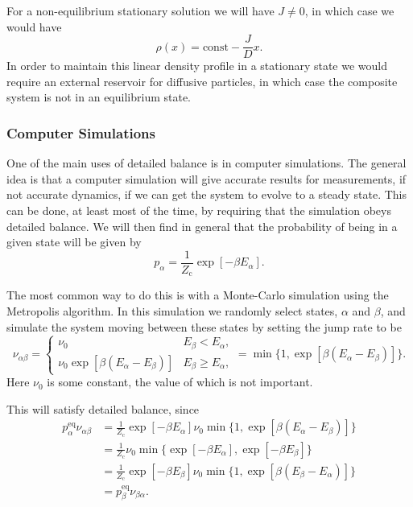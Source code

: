 \documentclass[fleqn]{NotesClass}
\newcommand*{\cpartition}{Z_{\mathrm{c}}}
\begin{document}
    For a non-equilibrium stationary solution we will have \(J \ne 0\), in which case we would have
    \begin{equation}
        \rho(x) = \mathrm{const} - \frac{J}{D}x.
    \end{equation}
    In order to maintain this linear density profile in a stationary state we would require an external reservoir for diffusive particles, in which case the composite system is not in an equilibrium state.
    
    \subsubsection{Computer Simulations}
    One of the main uses of detailed balance is in computer simulations.
    The general idea is that a computer simulation will give accurate results for measurements, if not accurate dynamics, if we can get the system to evolve to a steady state.
    This can be done, at least most of the time, by requiring that the simulation obeys detailed balance.
    We will then find in general that the probability of being in a given state will be given by
    \begin{equation}
        p_\alpha = \frac{1}{\cpartition} \exp[-\beta E_\alpha].
    \end{equation}
    
    The most common way to do this is with a Monte-Carlo simulation using the Metropolis algorithm.
    In this simulation we randomly select states, \(\alpha\) and \(\beta\), and simulate the system moving between these states by setting the jump rate to be
    \begin{equation}
        \nu_{\alpha\beta} = 
        \begin{cases}
            \nu_0 & E_\beta < E_\alpha,\\
            \nu_0\exp[\beta(E_\alpha - E_\beta)] & E_\beta \ge E_\alpha,
        \end{cases}
        = \min \{ 1, \exp[\beta(E_\alpha - E_\beta)] \}.
    \end{equation}
    Here \(\nu_0\) is some constant, the value of which is not important.
    
    This will satisfy detailed balance, since
    \begin{align}
        p_\alpha^{\mathrm{eq}}\nu_{\alpha\beta} &= \frac{1}{\cpartition} \exp[-\beta E_\alpha]\nu_0\min\{1, \exp[\beta(E_\alpha - E_\beta)]\}\\
        &= \frac{1}{\cpartition} \nu_0 \min\{ \exp[-\beta E_\alpha], \exp[-\beta E_\beta] \}\\
        &= \frac{1}{\cpartition} \exp[-\beta E_\beta] \nu_0 \min\{ 1, \exp[\beta(E_\beta - E_\alpha)] \}\\
        &= p_\beta^{\mathrm{eq}}\nu_{\beta\alpha}.
   \end{align}
    
\end{document}
